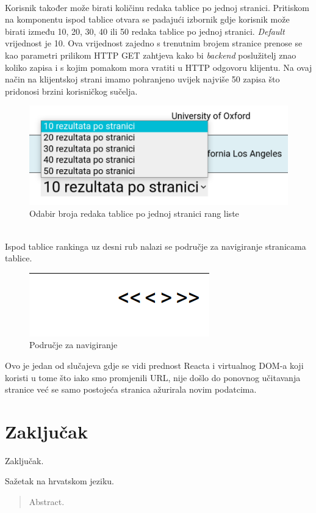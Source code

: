 \documentclass[times, utf8, zavrsni]{fer}
\begin{document}
\\Korisnik također može birati količinu redaka tablice po jednoj stranici. Pritiskom na komponentu ispod tablice otvara se 
padajući izbornik gdje korisnik može birati između 10, 20, 30, 40 ili 50 redaka tablice po jednoj stranici. \emph{Default} vrijednost je 10. Ova vrijednost zajedno s 
trenutnim brojem stranice prenose se kao parametri prilikom HTTP GET zahtjeva kako bi \emph{backend} poslužitelj znao koliko zapisa i s kojim pomakom mora vratiti u 
HTTP odgovoru klijentu. Na ovaj način na klijentskoj strani imamo pohranjeno uvijek najviše 50 zapisa što pridonosi brzini korisničkog sučelja.
\begin{figure}[htb]
    \centering
       \includegraphics[scale=0.3]{brojstranica.png} 
       \caption{Odabir broja redaka tablice po jednoj stranici rang liste}
       \label{fig:brojstranica}
       \end{figure}
\\Ispod tablice rankinga uz desni rub nalazi se područje za navigiranje stranicama tablice.        
\begin{figure}[htb]
    \centering
       \includegraphics[scale=0.3]{navigiranje.png} 
       \caption{Područje za navigiranje }
       \label{fig:brojstranica}
       \end{figure}
Ovo je jedan od slučajeva gdje se vidi prednost 
Reacta i virtualnog DOM-a koji koristi u tome što iako smo promjenili URL, nije došlo do ponovnog učitavanja stranice već se samo 
postojeća stranica ažurirala novim podatcima. 



\chapter{Zaključak}
Zaključak.




\begin{sazetak}
Sažetak na hrvatskom jeziku.

\end{sazetak}

\begin{abstract}
Abstract.

\end{abstract}
\end{document}
